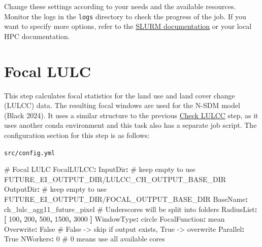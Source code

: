 \documentclass[
  letterpaper,
  DIV=11,
  numbers=noendperiod]{scrreprt}
\newenvironment{Shaded}{\begin{snugshade}}{\end{snugshade}}
\newcommand{\AttributeTok}[1]{\textcolor[rgb]{0.40,0.45,0.13}{#1}}
\newcommand{\CharTok}[1]{\textcolor[rgb]{0.13,0.47,0.30}{#1}}
\newcommand{\CommentTok}[1]{\textcolor[rgb]{0.37,0.37,0.37}{#1}}
\newcommand{\DecValTok}[1]{\textcolor[rgb]{0.68,0.00,0.00}{#1}}
\newcommand{\FunctionTok}[1]{\textcolor[rgb]{0.28,0.35,0.67}{#1}}
\newcommand{\KeywordTok}[1]{\textcolor[rgb]{0.00,0.23,0.31}{\textbf{#1}}}
\begin{document}
Change these settings according to your needs and the available
resources. Monitor the logs in the \texttt{logs} directory to check the
progress of the job. If you want to specify more options, refer to the
\href{https://slurm.schedmd.com/sbatch.html\#SECTION_OPTIONS}{SLURM
documentation} or your local HPC documentation.


\chapter{Focal LULC}\label{20_FocalLULC}

This step calculates focal statistics for the land use and land cover
change (LULCC) data. The resulting focal windows are used for the N-SDM
model (Black 2024). It uses a similar structure to the previous
\hyperref[11_CheckLULCC]{Check LULCC} step, as it uses another conda
environment and this task also has a separate job script. The
configuration section for this step is as follows:

\begin{codelisting}

\caption{\texttt{src/config.yml}}

\begin{Shaded}
\begin{Highlighting}[]
\CommentTok{\# Focal LULC}
\FunctionTok{FocalLULCC}\KeywordTok{:}
\AttributeTok{  }\FunctionTok{InputDir}\KeywordTok{:}\CommentTok{ \# keep empty to use FUTURE\_EI\_OUTPUT\_DIR/LULCC\_CH\_OUTPUT\_BASE\_DIR}
\AttributeTok{  }\FunctionTok{OutputDir}\KeywordTok{:}\CommentTok{ \# keep empty to use FUTURE\_EI\_OUTPUT\_DIR/FOCAL\_OUTPUT\_BASE\_DIR}
\AttributeTok{  }\FunctionTok{BaseName}\KeywordTok{:}\AttributeTok{ ch\_lulc\_agg11\_future\_pixel}\CommentTok{  \# Underscores will be split into folders}
\AttributeTok{  }\FunctionTok{RadiusList}\KeywordTok{:}\AttributeTok{ }\KeywordTok{[}\AttributeTok{ }\DecValTok{100}\KeywordTok{,}\AttributeTok{ }\DecValTok{200}\KeywordTok{,}\AttributeTok{ }\DecValTok{500}\KeywordTok{,}\AttributeTok{ }\DecValTok{1500}\KeywordTok{,}\AttributeTok{ }\DecValTok{3000}\AttributeTok{ }\KeywordTok{]}
\AttributeTok{  }\FunctionTok{WindowType}\KeywordTok{:}\AttributeTok{ circle}
\AttributeTok{  }\FunctionTok{FocalFunction}\KeywordTok{:}\AttributeTok{ mean}
\AttributeTok{  }\FunctionTok{Overwrite}\KeywordTok{:}\AttributeTok{ }\CharTok{False}\CommentTok{ \# False {-}\textgreater{} skip if output exists, True {-}\textgreater{} overwrite}
\AttributeTok{  }\FunctionTok{Parallel}\KeywordTok{:}\AttributeTok{ }\CharTok{True}
\AttributeTok{  }\FunctionTok{NWorkers}\KeywordTok{:}\AttributeTok{ }\DecValTok{0}\CommentTok{  \# 0 means use all available cores}
\end{Highlighting}
\end{Shaded}

\end{codelisting}
\end{document}
